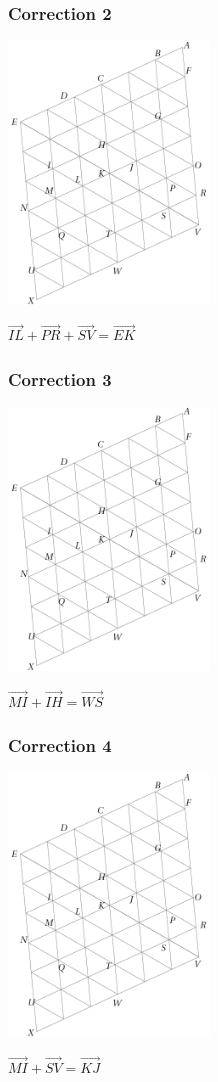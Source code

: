\documentclass[15pt, mathserif]{beamer}
\begin{document}
\begin{frame}
\vspace{-10mm}
	\frametitle{Correction 2}
\begin{center} 
 \includegraphics[width=0.4\textwidth]{GrilleIso2} \end{center}$\overrightarrow{IL}+\overrightarrow{PR}+\overrightarrow{SV}=\overrightarrow{EK}$\end{frame}


\begin{frame}
\vspace{-10mm}
	\frametitle{Correction 3}
\begin{center} 
 \includegraphics[width=0.4\textwidth]{GrilleIso2} \end{center}$\overrightarrow{MI}+\overrightarrow{IH}=\overrightarrow{WS}$  \end{frame}


\begin{frame}
\vspace{-10mm}
	\frametitle{Correction 4}
\begin{center} 
 \includegraphics[width=0.4\textwidth]{GrilleIso2} \end{center}$\overrightarrow{MI}+\overrightarrow{SV}=\overrightarrow{KJ}$  \end{frame}
\end{document}
